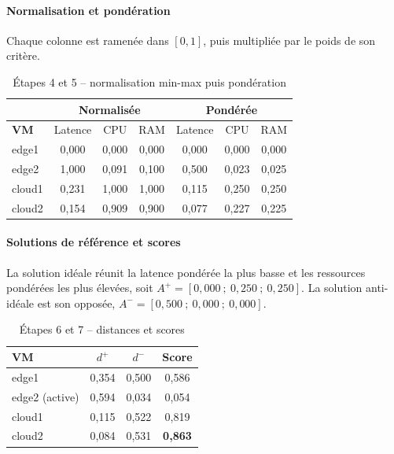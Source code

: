\paragraph{Normalisation et pondération}

Chaque colonne est ramenée dans $[0,1]$, puis multipliée par le poids de son critère.

\begin{table}[H]
    \centering
    \begin{tabular}{|l|c|c|c|c|c|c|}
        \hline
        & \multicolumn{3}{c|}{\textbf{Normalisée}} & \multicolumn{3}{c|}{\textbf{Pondérée}} \\
        \hline
        \textbf{VM} & Latence & CPU & RAM & Latence & CPU & RAM \\
        \hline
        edge1 & 0,000 & 0,000 & 0,000 & 0,000 & 0,000 & 0,000 \\
        \hline
        edge2 & 1,000 & 0,091 & 0,100 & 0,500 & 0,023 & 0,025 \\
        \hline
        cloud1 & 0,231 & 1,000 & 1,000 & 0,115 & 0,250 & 0,250 \\
        \hline
        cloud2 & 0,154 & 0,909 & 0,900 & 0,077 & 0,227 & 0,225 \\
        \hline
    \end{tabular}
    \caption{Étapes 4 et 5 -- normalisation min-max puis pondération}
    \label{tab:topsis-etape45}
\end{table}

\paragraph{Solutions de référence et scores}

La solution idéale réunit la latence pondérée la plus basse et les ressources pondérées les plus élevées, soit $A^{+} = [0{,}000\ ;\ 0{,}250\ ;\ 0{,}250]$. La solution anti-idéale est son opposée, $A^{-} = [0{,}500\ ;\ 0{,}000\ ;\ 0{,}000]$.

\begin{table}[H]
    \centering
    \begin{tabular}{|l|c|c|c|}
        \hline
        \textbf{VM} & $d^{+}$ & $d^{-}$ & \textbf{Score} \\
        \hline
        edge1 & 0,354 & 0,500 & 0,586 \\
        \hline
        edge2 (active) & 0,594 & 0,034 & 0,054 \\
        \hline
        cloud1 & 0,115 & 0,522 & 0,819 \\
        \hline
        cloud2 & 0,084 & 0,531 & \textbf{0,863} \\
        \hline
    \end{tabular}
    \caption{Étapes 6 et 7 -- distances et scores}
    \label{tab:topsis-etape67}
\end{table}

